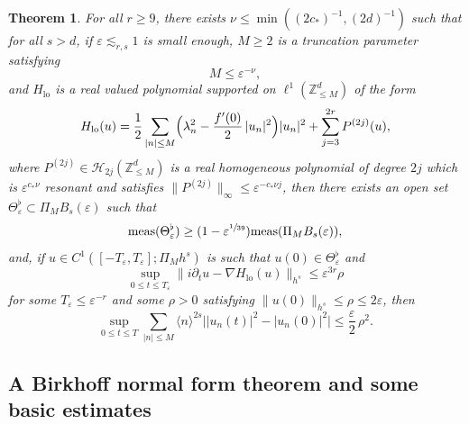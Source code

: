\documentclass[10pt,a4paper]{amsart}
\theoremstyle{plain}
\newtheorem{theorem}{Theorem}[section]
\theoremstyle{definition}
\DeclareMathOperator{\lo}{lo}
\newcommand{\1}{\mathbf{1}}
\let\epsilon\varepsilon
\begin{document}
\begin{theorem}
\label{thm:main_low}
For all $r\geq 9$, there exists $\nu \leq \min((2c_\ast)^{-1},(2d)^{-1})$ such that for all $s>d$, if $\varepsilon \lesssim_{r,s} 1$ is small enough, $M\geq 2$ is a truncation parameter satisfying
\[
M \leq \varepsilon^{-\nu},
\]
and $H_{\lo}$ is a real valued polynomial supported on $\ell^1(\mathbb{Z}^d_{\leq M})$ of the form
\begin{equation}
\label{eq:Hlo-0}
H_{\lo}(u) = \frac12 \sum_{|n|\leq M} \Bigl(\lambda_n^2 - \frac{f'(0)}2\, |u_n|^2\Bigl) |u_n|^2 + \sum_{j=3}^{2r} P^{(2j)}(u),
\end{equation}
where $P^{(2j)} \in \mathcal{H}_{2j}(\mathbb{Z}^d_{\leq M})$ is a real homogeneous polynomial of degree $2j$ which is
$\varepsilon^{c_* \nu}$ resonant and satisfies $\| P^{(2j)} \|_{\infty} \leq \varepsilon^{- c_* \nu j }$, then
there exists an open set $\Theta_{\varepsilon}^\flat \subset \Pi_{M} B_s(\varepsilon)$ such that
\begin{equation}
\label{eq:density}
\mathrm{meas}(\Theta_{\varepsilon}^\flat) \geq (1 - \varepsilon^{\sfrac{1}{39}})\mathrm{meas}(\Pi_{M} B_s(\varepsilon)),
\end{equation}
and, if $u \in C^1([-T_{\epsilon},T_{\epsilon}];\Pi_M h^s)$ is such that $u(0) \in \Theta_{\varepsilon}^\flat$ and
\[
\sup_{0\leq t \leq T_{\epsilon}} \| i\partial_t u - \nabla H_{\lo} (u) \|_{h^s} \leq \varepsilon^{3r}\rho
\]
for some $T_{\epsilon}\leq \varepsilon^{- r}$ and some $\rho>0$ satisfying $\|u(0)\|_{h^s} \leq \rho \leq 2 \varepsilon$, then
\begin{equation}
\label{eq:boo-u}
\sup_{0\leq t \leq T} \sum_{|n|\leq M} \langle n\rangle^{2s} \big| |u_n(t)|^2 - |u_n(0)|^2 \big|\leq \frac{\varepsilon }2\, \rho^2.
\end{equation}
\end{theorem}

\subsection{A Birkhoff normal form theorem and some basic estimates}
\end{document}
